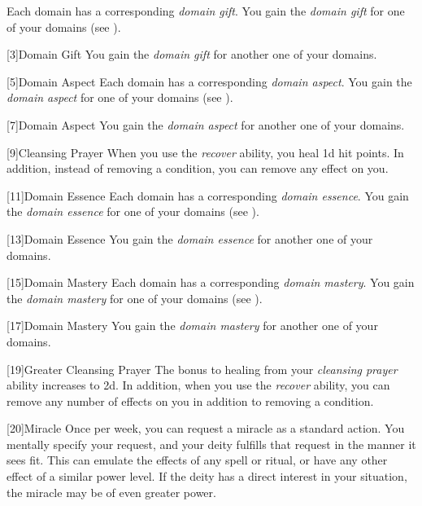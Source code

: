         Each domain has a corresponding \textit{domain gift}.
        You gain the \textit{domain gift} for one of your domains (see ).

        [3]{Domain Gift}
        You gain the \textit{domain gift} for another one of your domains.

        [5]{Domain Aspect}
        Each domain has a corresponding \textit{domain aspect}.
        You gain the \textit{domain aspect} for one of your domains (see ).

        [7]{Domain Aspect} 
        You gain the \textit{domain aspect} for another one of your domains.

        [9]{Cleansing Prayer}
        When you use the \textit{recover} ability, you heal \plus1d hit points.
        In addition, instead of removing a condition, you can remove any  effect on you.

        [11]{Domain Essence}
        Each domain has a corresponding \textit{domain essence}.
        You gain the \textit{domain essence} for one of your domains (see ).

        [13]{Domain Essence} 
        You gain the \textit{domain essence} for another one of your domains.

        [15]{Domain Mastery}
        Each domain has a corresponding \textit{domain mastery}.
        You gain the \textit{domain mastery} for one of your domains (see ).

        [17]{Domain Mastery} 
        You gain the \textit{domain mastery} for another one of your domains.

        [19]{Greater Cleansing Prayer} 
        The bonus to healing from your \textit{cleansing prayer} ability increases to \plus2d.
        In addition, when you use the \textit{recover} ability, you can remove any number of  effects on you in addition to removing a condition.

        [20]{Miracle}
        Once per week, you can request a miracle as a standard action.
        You mentally specify your request, and your deity fulfills that request in the manner it sees fit.
        This can emulate the effects of any spell or ritual, or have any other effect of a similar power level.
        If the deity has a direct interest in your situation, the miracle may be of even greater power.

